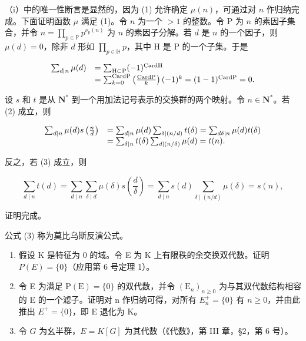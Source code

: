 （i）中的唯一性断言是显然的，因为 (1) 允许确定 \(\mu(n)\)，可通过对 \(n\) 作归纳完成。下面证明函数 \(\mu\) 满足 (1)。令 \(n\) 为一个 \(>1\) 的整数。令 P 为 \(n\) 的素因子集合，并令 \(n = \prod_{p \in \mathbb{P}} p^{\nu_p(n)}\) 为 \(n\) 的素因子分解。若 \(d\) 是 \(n\) 的一个因子，则 \(\mu(d) = 0\)，除非 \(d\) 形如 \(\prod_{p \in \mathbb{H}} p\)，其中 H 是 P 的一个子集。于是

\[
\begin{array}{r l} \sum_ {d | n} \mu (d) & = \sum_ {\mathrm{H} \subset \mathrm{P}} (- 1) ^ {\mathrm{CardH}} \\ & = \sum_ {k = 0} ^ {\mathrm{CardP}} \left(\frac {\mathrm{CardP}}{k}\right) (- 1) ^ {k} = (1 - 1) ^ {\mathrm{CardP}} = 0. \end{array}
\]


设 \(s\) 和 \(t\) 是从 \(\mathbf{N}^*\) 到一个用加法记号表示的交换群的两个映射。令 \(n \in \mathbf{N}^*\)。若 (2) 成立，则

\[
\begin{array}{r l} \sum_ {d | n} \mu (d) s \left(\frac {n}{d}\right) & = \sum_ {d | n} \mu (d) \sum_ {\delta \mid (n / d)} t (\delta) = \sum_ {d \delta | n} \mu (d) t (\delta) \\ & = \sum_ {\delta | n} t (\delta) \sum_ {d \mid (n / \delta)} \mu (d) = t (n). \end{array}
\]

反之，若 (3) 成立，则

\[
\sum_ {d \mid n} t (d) = \sum_ {d \mid n} \sum_ {\delta \mid d} \mu (\delta) s \left(\frac {d}{\delta}\right) = \sum_ {d \mid n} s (d) \sum_ {\delta \mid (n / d)} \mu (\delta) = s (n),
\]

证明完成。

公式 (3) 称为莫比乌斯反演公式。




\begin{enumerate}
\def\labelenumi{\arabic{enumi}.}
\item
  假设 K 是特征为 0 的域。令 E 为 K 上有限秩的余交换双代数。证明 \(P(E) = \{0\}\)（应用第 6 号定理 1）。
\item
  令 E 为满足 \(\mathrm{P}(\mathrm{E})=\{0\}\) 的双代数，并令 \((\mathrm{E}_{n})_{n\geqslant0}\) 为与其双代数结构相容的 E 的一个滤子。证明对 n 作归纳可得，对所有 \(E_{n}^{+}=\{0\}\) 有 \(n\geqslant0\)，并由此推出 \(E^{+}=\{0\}\)，即 E 退化为 K。
\item
  令 \(G\) 为幺半群，\(E = K[G]\) 为其代数（《代数》，第 III 章，§2，第 6 号）。
\end{enumerate}

